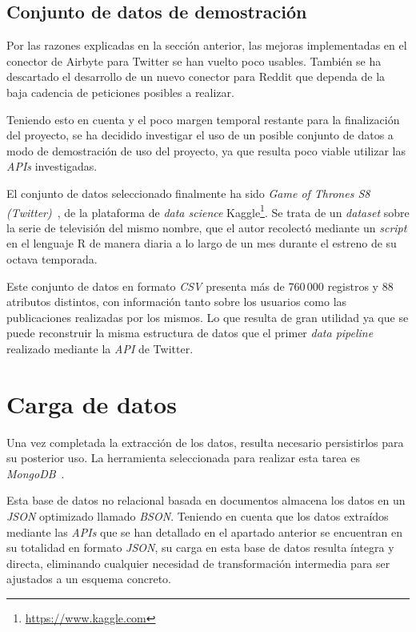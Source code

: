 \subsection{Conjunto de datos de demostración}

Por las razones explicadas en la sección anterior, las mejoras implementadas en el conector de Airbyte para Twitter se han vuelto poco usables. También se ha descartado el desarrollo de un nuevo conector para Reddit que dependa de la baja cadencia de peticiones posibles a realizar.

Teniendo esto en cuenta y el poco margen temporal restante para la finalización del proyecto, se ha decidido investigar el uso de un posible conjunto de datos a modo de demostración de uso del proyecto, ya que resulta poco viable utilizar las \textit{APIs} investigadas.

El conjunto de datos seleccionado finalmente ha sido \textit{Game of Thrones S8 (Twitter)}~\cite{got8}, de la plataforma de \textit{data science} Kaggle\footnote{\url{https://www.kaggle.com}}. Se trata de un \textit{dataset} sobre la serie de televisión del mismo nombre, que el autor recolectó mediante un \textit{script} en el lenguaje R de manera diaria a lo largo de un mes durante el estreno de su octava temporada.

Este conjunto de datos en formato \textit{CSV} presenta más de 760\,000 registros y 88 atributos distintos, con información tanto sobre los usuarios como las publicaciones realizadas por los mismos. Lo que resulta de gran utilidad ya que se puede reconstruir la misma estructura de datos que el primer \textit{data pipeline} realizado mediante la \textit{API} de Twitter.

\section{Carga de datos}

Una vez completada la extracción de los datos, resulta necesario persistirlos para su posterior uso. La herramienta seleccionada para realizar esta tarea es \textit{MongoDB}~\cite{mongodbArchitecture}.

Esta base de datos no relacional basada en documentos almacena los datos en un \textit{JSON} optimizado llamado \textit{BSON}. Teniendo en cuenta que los datos extraídos mediante las \textit{APIs} que se han detallado en el apartado anterior se encuentran en su totalidad en formato \textit{JSON}, su carga en esta base de datos resulta íntegra y directa, eliminando cualquier necesidad de transformación intermedia para ser ajustados a un esquema concreto.

